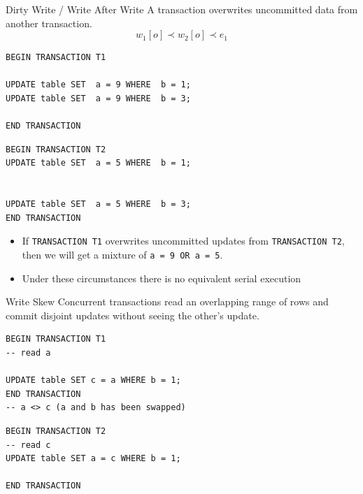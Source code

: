 \begin{definitionbox}{Dirty Write / Write After Write}
    A transaction overwrites uncommitted data from another transaction.
    \[w_1[o] \prec w_2[o] \prec e_1\]
    \tcblower
    \begin{minipage}[t]{.49\textwidth}
        \begin{verbatim}
BEGIN TRANSACTION T1

UPDATE table SET  a = 9 WHERE  b = 1;
UPDATE table SET  a = 9 WHERE  b = 3;

END TRANSACTION
       \end{verbatim}
   \end{minipage} \hfill \begin{minipage}[t]{.49\textwidth}
       \begin{verbatim}
BEGIN TRANSACTION T2
UPDATE table SET  a = 5 WHERE  b = 1;


UPDATE table SET  a = 5 WHERE  b = 3;
END TRANSACTION
       \end{verbatim}
   \end{minipage}
   \begin{itemize}
     \item If \texttt{TRANSACTION T1} overwrites uncommitted updates from \texttt{TRANSACTION T2}, then we will get a mixture of \texttt{a = 9 OR a = 5}.
     \item Under these circumstances there is no equivalent serial execution
   \end{itemize}
\end{definitionbox}

\begin{definitionbox}{Write Skew}
    Concurrent transactions read an overlapping range of rows and commit disjoint updates without seeing the other's update.
    \tcblower
    \begin{minipage}[t]{.49\textwidth}
        \begin{verbatim}
BEGIN TRANSACTION T1
-- read a

UPDATE table SET c = a WHERE b = 1;
END TRANSACTION
-- a <> c (a and b has been swapped)
       \end{verbatim}
   \end{minipage} \hfill \begin{minipage}[t]{.49\textwidth}
       \begin{verbatim}
BEGIN TRANSACTION T2
-- read c
UPDATE table SET a = c WHERE b = 1;

END TRANSACTION
       \end{verbatim}
   \end{minipage}
\end{definitionbox}

